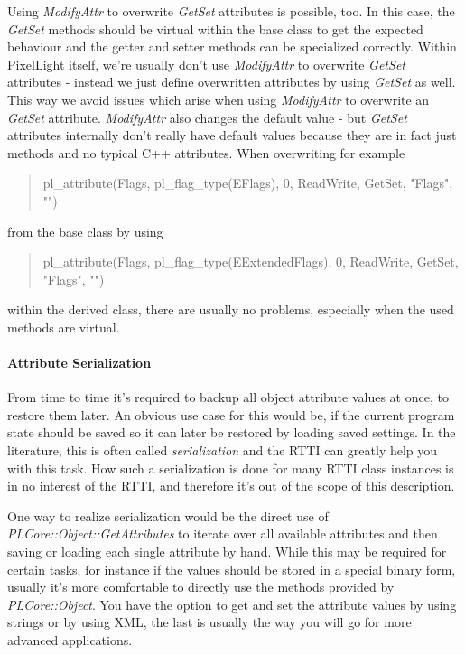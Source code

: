 Using \emph{ModifyAttr} to overwrite \emph{GetSet} attributes is possible, too. In this case, the \emph{GetSet} methods should be virtual within the base class to get the expected behaviour and the getter and setter methods can be specialized correctly. Within PixelLight itself, we're usually don't use \emph{ModifyAttr} to overwrite \emph{GetSet} attributes - instead we just define overwritten attributes by using \emph{GetSet} as well. This way we avoid issues which arise when using \emph{ModifyAttr} to overwrite an \emph{GetSet} attribute. \emph{ModifyAttr} also changes the default value - but \emph{GetSet} attributes internally don't really have default values because they are in fact just methods and no typical C++ attributes. When overwriting for example \begin{quote}pl\_attribute(Flags, pl\_flag\_type(EFlags), 0, ReadWrite, GetSet, "Flags", "")\end{quote} from the base class by using \begin{quote}pl\_attribute(Flags, pl\_flag\_type(EExtendedFlags), 0, ReadWrite, GetSet, "Flags", "") \end{quote} within the derived class, there are usually no problems, especially when the used methods are virtual.


\paragraph{Attribute Serialization}
From time to time it's required to backup all object attribute values at once, to restore them later. An obvious use case for this would be, if the current program state should be saved so it can later be restored by loading saved settings. In the literature, this is often called \emph{serialization} and the RTTI can greatly help you with this task. How such a serialization is done for many RTTI class instances is in no interest of the RTTI, and therefore it's out of the scope of this description.

One way to realize serialization would be the direct use of \emph{PLCore::Object::GetAttributes} to iterate over all available attributes and then saving or loading each single attribute by hand. While this may be required for certain tasks, for instance if the values should be stored in a special binary form, usually it's more comfortable to directly use the methods provided by \emph{PLCore::Object}. You have the option to get and set the attribute values by using strings or by using XML, the last is usually the way you will go for more advanced applications.

